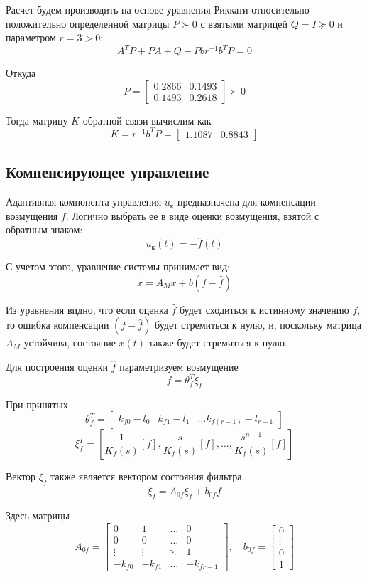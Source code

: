 \documentclass[a4paper,hidelinks,14pt]{extarticle}
\begin{document}
	Расчет будем производить на основе уравнения Риккати относительно положительно определенной матрицы $P \succ 0$ с взятыми матрицей $Q = I \succcurlyeq 0$ и параметром $r = 3 > 0$:
	\[
		A^T P + PA + Q - P b r^{-1} b^T P = 0
	\]

	Откуда
	\[
		P = \begin{bmatrix}
			0.2866 & 0.1493  \\
			0.1493 & 0.2618 
		\end{bmatrix} \succ 0
	\]

	Тогда матрицу $K$ обратной связи вычислим как
	\[
		K = r^{-1} b^T P = \begin{bmatrix}
			1.1087 & 0.8843
		\end{bmatrix}
	\]

	\subsection{Компенсирующее управление}
	Адаптивная компонента управления $u_{\text{к}}$ предназначена для компенсации возмущения $f$. Логично выбрать ее в виде оценки возмущения, взятой с обратным знаком:
	\begin{equation}
	u_{\text{к}}(t) = -\hat{f}(t)
	\end{equation}

	С учетом этого, уравнение системы принимает вид:
	\[
	\dot{x} = A_M x + b(f - \hat{f})
	\]

	Из уравнения видно, что если оценка $\hat{f}$ будет сходиться к истинному значению $f$, то ошибка компенсации $(f - \hat{f})$ будет стремиться к нулю, и, поскольку матрица $A_M$ устойчива, состояние $x(t)$ также будет стремиться к нулю.

	Для построения оценки $\hat{f}$ параметризуем возмущение
	\begin{equation}
	f = \theta_f^T\xi_f
	\end{equation}

	При принятых
	\[
		\theta_f^T = \begin{bmatrix}
			k_{f0} - l_0 & k_{f1} - l_1 & \dots k_{f(r-1)} - l_{r-1}
		\end{bmatrix}
	\]
	\[
		\xi_f^T = \left[ \frac{1}{K_f(s)}[f], \frac{s}{K_f(s)}[f], \dots, \frac{s^{n-1}}{K_f(s)}[f] \right]
	\]

	Вектор $\xi_f$ также является вектором состояния фильтра
	\begin{equation}
		\dot{\xi}_f = A_{0f} \xi_f + b_{0f} f	
	\end{equation}
	
	Здесь матрицы
	\[
		A_{0f} = \begin{bmatrix} 
			0 & 1 & \dots & 0 \\ 
			0 & 0 & \dots & 0 \\ 
			\vdots & \vdots & \ddots & 1 \\ 
			-k_{f0} & -k_{f1} & \dots & -k_{fr-1} 
			\end{bmatrix}, \quad 
			b_{0f} = \begin{bmatrix} 
			0 \\ \vdots \\ 0 \\ 1 
			\end{bmatrix}
	\]
\end{document}
